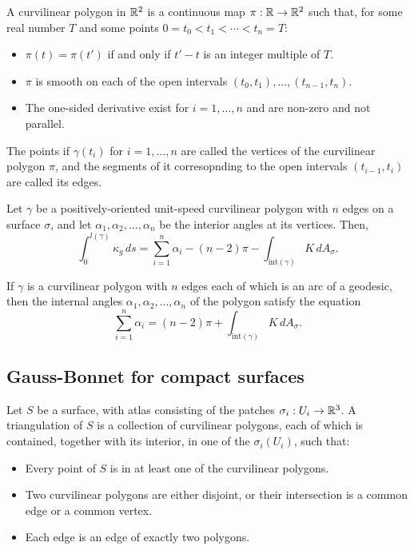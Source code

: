 \begin{defn}
  A curvilinear polygon in $\mathbb{R}^2$ is a continuous map $\pi: \mathbb{R} \to \mathbb{R}^2$ such that, for
  some real number $T$ and some points $0 = t_0 < t_1 < \cdots < t_n = T$:
  \begin{itemize}
    \item $\pi(t) = \pi(t')$ if and only if $t' - t$ is an integer multiple of $T$.
    \item $\pi$ is smooth on each of the open intervals $(t_0, t_1), \dots, (t_{n - 1}, t_n)$.
    \item The one-sided derivative exist for $i = 1, \dots, n$ and are non-zero and not parallel.
  \end{itemize}
  The points if $\gamma(t_i)$ for $i = 1, \dots, n$ are called the vertices of the curvilinear
  polygon $\pi$, and the segments of it corresopnding to the open intervals $(t_{i - 1}, t_i)$
  are called its edges.
\end{defn}

\begin{theorem}
  Let $\gamma$ be a positively-oriented unit-speed curvilinear polygon with $n$ edges on a
  surface $\sigma$, and let $\alpha_1, \alpha_2, \dots, \alpha_n$ be the interior angles at its vertices.
  Then,
  \[
    \int_0^{l(\gamma)} \kappa_g \, ds = \sum_{i = 1}^n \alpha_i - (n - 2) \pi - \int_{\text{int}(\gamma)} K \, dA_{\sigma}.
  \]
\end{theorem}

\begin{corollary}
  If $\gamma$ is a curvilinear polygon with $n$ edges each of which is an arc of a geodesic,
  then the internal angles $\alpha_1, \alpha_2, \dots, \alpha_n$ of the polygon satisfy the equation
  \[
    \sum_{i = 1}^n \alpha_i = (n - 2) \pi + \int_{\text{int}(\gamma)} K \, dA_{\sigma}.
  \]
\end{corollary}

\subsection{Gauss-Bonnet for compact surfaces}

\begin{defn}
  Let $S$ be a surface, with atlas consisting of the patches $\sigma_i: U_i \to \mathbb{R}^3$.
  A triangulation of $S$ is a collection of curvilinear polygons, each of which is contained,
  together with its interior, in one of the $\sigma_i(U_i)$, such that:
  \begin{itemize}
    \item Every point of $S$ is in at least one of the curvilinear polygons.
    \item Two curvilinear polygons are either disjoint, or their intersection is a common edge or a common vertex.
    \item Each edge is an edge of exactly two polygons.
  \end{itemize}
\end{defn}

